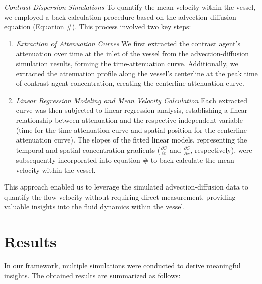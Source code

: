 \documentclass[times,twocolumn,final]{elsarticle}
\begin{document}
\textit{Contrast Dispersion Simulations} To quantify the mean velocity within the vessel, we employed a back-calculation procedure based on the advection-diffusion equation (Equation #). This process involved two key steps:
\begin{enumerate}
    \item \textit{Extraction of Attenuation Curves} We first extracted the contrast agent's attenuation over time at the inlet of the vessel from the advection-diffusion simulation results, forming the time-attenuation curve. Additionally, we extracted the attenuation profile along the vessel's centerline at the peak time of contrast agent concentration, creating the centerline-attenuation curve.
    \item \textit{Linear Regression Modeling and Mean Velocity Calculation} Each extracted curve was then subjected to linear regression analysis, establishing a linear relationship between attenuation and the respective independent variable (time for the time-attenuation curve and spatial position for the centerline-attenuation curve). The slopes of the fitted linear models, representing the temporal and spatial concentration gradients ($\frac{\partial C}{\partial t}$ and $\frac{\partial C}{\partial x}$, respectively), were subsequently incorporated into equation # to back-calculate the mean velocity within the vessel.
\end{enumerate}
This approach enabled us to leverage the simulated advection-diffusion data to quantify the flow velocity without requiring direct measurement, providing valuable insights into the fluid dynamics within the vessel.

\section{Results}
In our framework, multiple simulations were conducted to derive meaningful insights. The obtained results are summarized as follows:
\end{document}

